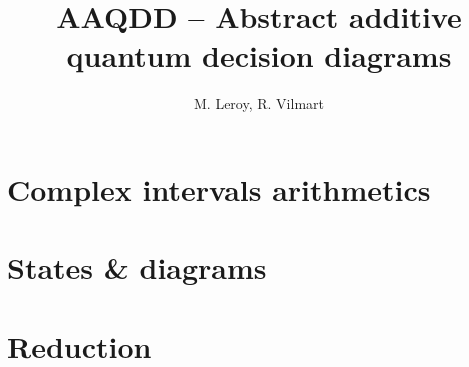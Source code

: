 \documentclass[a4paper]{report}
\title{AAQDD -- Abstract additive quantum decision diagrams}
\author{M. Leroy, R. Vilmart}
\begin{document}
\maketitle

\tableofcontents

\newpage

\chapter{Complex intervals arithmetics}



\chapter{States \& diagrams}



\chapter{Reduction}


\end{document}
